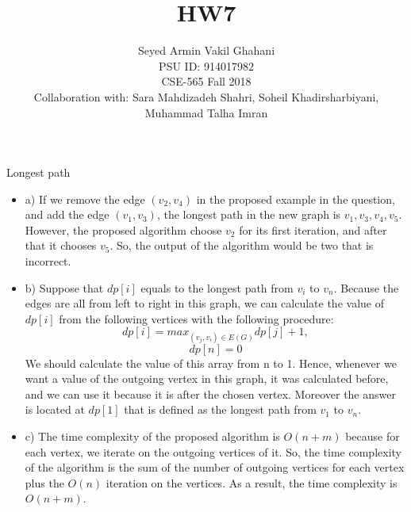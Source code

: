 \documentclass[12pt]{article}
\newenvironment{solution}[2][Solution]{\begin{trivlist}
\item[\hskip \labelsep {\bfseries #1}]}{\end{trivlist}}
\newenvironment{problem}[2][Problem]{\begin{trivlist}
\item[\hskip \labelsep {\bfseries #1}\hskip \labelsep {\bfseries #2.}]}{\end{trivlist}}
\begin{document}
 
\title{\textbf{HW7}}%
\author{Seyed Armin Vakil Ghahani\\ %
PSU ID: 914017982\\
CSE-565 Fall 2018\\
Collaboration with:
Sara Mahdizadeh Shahri, Soheil Khadirsharbiyani,\\
Muhammad Talha Imran} %
 
\maketitle
\begin{problem}{1}
Longest path
\end{problem}

\begin{solution}{}
\begin{itemize}
\item a) If we remove the edge $(v_2, v_4)$ in the proposed example in the question,
and add the edge $(v_1, v_3)$, the longest path in the new graph is $v_1, v_3, v_4,
v_5$. However, the proposed algorithm choose $v_2$ for its first iteration, and after
that it chooses $v_5$. So, the output of the algorithm would be two that is incorrect.

\item b) Suppose that $dp[i]$ equals to the longest path from $v_i$ to $v_n$. Because
the edges are all from left to right in this graph, we can calculate the value of
$dp[i]$ from the following vertices with the following procedure:
$$dp[i] = max_{(v_j, v_i)\in E(G)} dp[j] + 1,$$ $$ dp[n] = 0$$
We should calculate the value of this array from n to 1. Hence, whenever we want a
value of the outgoing vertex in this graph, it was calculated before, and we can
use it because it is after the chosen vertex. Moreover the answer is located at $dp[1]$
that is defined as the longest path from $v_1$ to $v_n$.

\item c) The time complexity of the proposed algorithm is $O(n+m)$ because for each
vertex, we iterate on the outgoing vertices of it. So, the time complexity of the 
algorithm is the sum of the number of outgoing vertices for each vertex plus the $O(n)$
iteration on the vertices. As a result, the time complexity is $O(n+m)$.
\end{itemize}
\end{solution}
\end{document}
